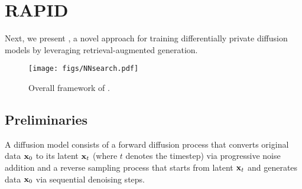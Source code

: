 

\section{RAPID}

Next, we present \system, a novel approach for training differentially private diffusion models by leveraging retrieval-augmented generation.


\begin{figure}[!t]
    \centering
    \texttt{[image: figs/NNsearch.pdf]}
        \caption{Overall framework of \system.}
    \label{fig:NNflow}
\end{figure}

\subsection{Preliminaries}

A diffusion model consists of a forward diffusion process that converts original data ${\mathbf{x}}_0$ to its latent ${\mathbf{x}}_t$ (where $t$ denotes the timestep) via progressive noise addition and a reverse sampling process that starts from latent ${\mathbf{x}}_t$ and generates data ${\mathbf{x}}_0$ via sequential denoising steps. 

